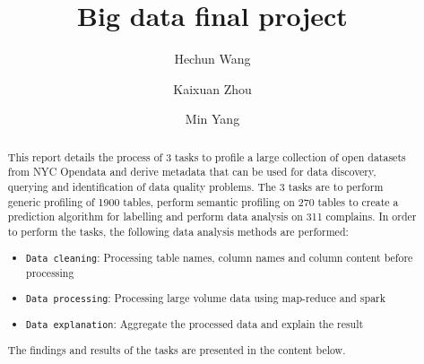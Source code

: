 \documentclass[sigconf]{acmart}
\begin{document}
\title{Big data final project}

\author{Hechun Wang}

\author{Kaixuan Zhou}

\author{Min Yang}




\begin{abstract}
This report details the process of 3 tasks to profile a large collection of open datasets from NYC Opendata and derive metadata that can be used for data discovery, querying and identification of data quality problems. The 3 tasks are to perform generic profiling of 1900 tables, perform semantic profiling on 270 tables to create a prediction algorithm for labelling and perform data analysis on 311 complains.
In order to perform the tasks, the following data analysis methods are performed:
\begin{itemize}
\item {\verb|Data cleaning|}: Processing table names, column names and column content before processing
\item {\verb|Data processing|}: Processing large volume data using map-reduce and spark
\item {\verb|Data explanation|}: Aggregate the processed data and explain the result
\end{itemize}
The findings and results of the tasks are presented in the content below. 
\end{abstract}



\maketitle
\end{document}
